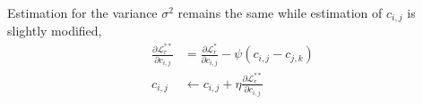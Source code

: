 \documentclass{sig-alternate}
\begin{document}
Estimation for the variance $\sigma^2$ remains the same while estimation of $c_{i,j}$ is slightly modified,
\begin{align*}
	\frac{\partial \mathcal{L}^{**}_r}{\partial c_{i,j}} &= \frac{\partial \mathcal{L}^*_r}{\partial c_{i,j}} - \psi (c_{i,j} - c_{j,k}) \\
	c_{i,j} &\leftarrow c_{i,j} + \eta \frac{\partial \mathcal{L}^{**}_r}{\partial c_{i,j}}
\end{align*}



\end{document}
